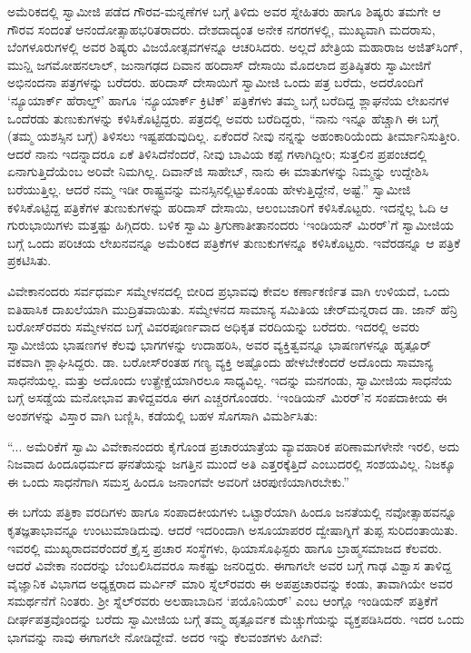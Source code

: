 ಅಮೆರಿಕದಲ್ಲಿ ಸ್ವಾಮೀಜಿ ಪಡೆದ ಗೌರವ-ಮನ್ನಣೆಗಳ ಬಗ್ಗೆ ತಿಳಿದು ಅವರ ಸ್ನೇಹಿತರು ಹಾಗೂ ಶಿಷ್ಯರು ತಮಗೇ ಆ ಗೌರವ ಸಂದಂತೆ ಆನಂದೋತ್ಸಾಹಭರಿತರಾದರು. ದೇಶದಾದ್ಯಂತ ಅನೇಕ ನಗರಗಳಲ್ಲಿ, ಮುಖ್ಯವಾಗಿ ಮದರಾಸು, ಬೆಂಗಳೂರುಗಳಲ್ಲಿ ಅವರ ಶಿಷ್ಯರು ವಿಜಯೋತ್ಸವಗಳನ್ನೂ ಆಚರಿಸಿದರು. ಅಲ್ಲದೆ ಖೇತ್ರಿಯ ಮಹಾರಾಜ ಅಜಿತ್​ಸಿಂಗ್, ಮುನ್ಷಿ ಜಗಮೋಹನಲಾಲ್, ಜುನಾಗಢದ ದಿವಾನ ಹರಿದಾಸ್ ದೇಸಾಯಿ ಮೊದಲಾದ ಪ್ರತಿಷ್ಠಿತರು ಸ್ವಾಮೀಜಿಗೆ ಅಭಿನಂದನಾ ಪತ್ರಗಳನ್ನು ಬರೆದರು. ಹರಿದಾಸ್ ದೇಸಾಯಿಗೆ ಸ್ವಾಮೀಜಿ ಒಂದು ಪತ್ರ ಬರೆದು, ಅದರೊಂದಿಗೆ ‘ನ್ಯೂಯಾರ್ಕ್ ಹೆರಾಲ್ಡ್​’ ಹಾಗೂ ‘ನ್ಯೂಯಾರ್ಕ್ ಕ್ರಿಟಿಕ್​’ ಪತ್ರಿಕೆಗಳು ತಮ್ಮ ಬಗ್ಗೆ ಬರೆದಿದ್ದ ಶ್ಲಾಘನೆಯ ಲೇಖನಗಳ ಒಂದೆರಡು ತುಣುಕುಗಳನ್ನು ಕಳಿಸಿಕೊಟ್ಟಿದ್ದರು. ಪತ್ರದಲ್ಲಿ ಅವರು ಬರೆದಿದ್ದರು, “ನಾನು ಇನ್ನೂ ಹೆಚ್ಚಾಗಿ ಈ ಬಗ್ಗೆ (ತಮ್ಮ ಯಶಸ್ಸಿನ ಬಗ್ಗೆ) ತಿಳಿಸಲು ಇಷ್ಟಪಡುವುದಿಲ್ಲ. ಏಕೆಂದರೆ ನೀವು ನನ್ನನ್ನು ಅಹಂಕಾರಿಯೆಂದು ತೀರ್ಮಾನಿಸುತ್ತೀರಿ. ಆದರೆ ನಾನು ಇದನ್ನಾದರೂ ಏಕೆ ತಿಳಿಸಿದೆನೆಂದರೆ, ನೀವು ಬಾವಿಯ ಕಪ್ಪೆ ಗಳಾಗಿದ್ದೀರಿ; ಸುತ್ತಲಿನ ಪ್ರಪಂಚದಲ್ಲಿ ಏನಾಗುತ್ತಿದೆಯೆಂಬ ಅರಿವೇ ನಿಮಗಿಲ್ಲ. ದಿವಾನ್​ಜಿ ಸಾಹೇಬ್, ನಾನು ಈ ಮಾತುಗಳನ್ನು ನಿಮ್ಮನ್ನು ಉದ್ದೇಶಿಸಿ ಬರೆಯುತ್ತಿಲ್ಲ. ಆದರೆ ನಮ್ಮ ಇಡೀ ರಾಷ್ಟ್ರವನ್ನು ಮನಸ್ಸಿನಲ್ಲಿಟ್ಟುಕೊಂಡು ಹೇಳುತ್ತಿದ್ದೇನೆ, ಅಷ್ಟೆ.” ಸ್ವಾಮೀಜಿ ಕಳಿಸಿಕೊಟ್ಟಿದ್ದ ಪತ್ರಿಕೆಗಳ ತುಣುಕುಗಳನ್ನು ಹರಿದಾಸ್ ದೇಸಾಯಿ, ಆಲಂಬಜಾರಿಗೆ ಕಳಿಸಿಕೊಟ್ಟರು. ಇದನ್ನೆಲ್ಲ ಓದಿ ಆ ಗುರುಭಾಯಿಗಳು ಮತ್ತಷ್ಟು ಹಿಗ್ಗಿದರು. ಬಳಿಕ ಸ್ವಾಮಿ ತ್ರಿಗುಣಾತೀತಾನಂದರು ‘ಇಂಡಿಯನ್ ಮಿರರ್​’ಗೆ ಸ್ವಾಮೀಜಿಯ ಬಗ್ಗೆ ಒಂದು ಪರಿಚಯ ಲೇಖನವನ್ನೂ ಅಮೆರಿಕದ ಪತ್ರಿಕೆಗಳ ತುಣುಕುಗಳನ್ನೂ ಕಳಿಸಿಕೊಟ್ಟರು. ಇವೆರಡನ್ನೂ ಆ ಪತ್ರಿಕೆ ಪ್ರಕಟಿಸಿತು.

ವಿವೇಕಾನಂದರು ಸರ್ವಧರ್ಮ ಸಮ್ಮೇಳನದಲ್ಲಿ ಬೀರಿದ ಪ್ರಭಾವವು ಕೇವಲ ಕರ್ಣಾಕರ್ಣಿತ ವಾಗಿ ಉಳಿಯದೆ, ಒಂದು ಐತಿಹಾಸಿಕ ದಾಖಲೆಯಾಗಿ ಮುದ್ರಿತವಾಯಿತು. ಸಮ್ಮೇಳನದ ಸಾಮಾನ್ಯ ಸಮಿತಿಯ ಚೇರ್​ಮನ್ನರಾದ ಡಾ. ಜಾನ್ ಹೆನ್ರಿ ಬರೋಸ್​ರವರು ಸಮ್ಮೇಳನದ ಬಗ್ಗೆ ವಿವರಪೂರ್ಣವಾದ ಅಧಿಕೃತ ವರದಿಯನ್ನು ಬರೆದರು. ಇದರಲ್ಲಿ ಅವರು ಸ್ವಾಮೀಜಿಯ ಭಾಷಣಗಳ ಕೆಲವು ಭಾಗಗಳನ್ನು ಉದಾಹರಿಸಿ, ಅವರ ವ್ಯಕ್ತಿತ್ವವನ್ನೂ ಭಾಷಣಗಳನ್ನೂ ಹೃತ್ಪೂರ್ ವಕವಾಗಿ ಶ್ಲಾಘಿಸಿದ್ದರು. ಡಾ. ಬರೋಸ್​ರಂತಹ ಗಣ್ಯ ವ್ಯಕ್ತಿ ಅಷ್ಟೊಂದು ಹೇಳಬೇಕೆಂದರೆ ಅದೊಂದು ಸಾಮಾನ್ಯ ಸಾಧನೆಯಲ್ಲ. ಮತ್ತು ಅದೊಂದು ಉತ್ಪ್ರೇಕ್ಷೆಯಾಗಿರಲೂ ಸಾಧ್ಯವಿಲ್ಲ. ಇದನ್ನು ಮನಗಂಡು, ಸ್ವಾಮೀಜಿಯ ಸಾಧನೆಯ ಬಗ್ಗೆ ಅಸಡ್ಡೆಯ ಮನೋಭಾವ ತಾಳಿದ್ದವರೂ ಈಗ ಎಚ್ಚರಗೊಂಡರು. ‘ಇಂಡಿಯನ್ ಮಿರರ್​’ನ ಸಂಪದಾಕೀಯ ಈ ಅಂಶಗಳನ್ನು ವಿಸ್ತಾರ ವಾಗಿ ಬಣ್ಣಿಸಿ, ಕಡೆಯಲ್ಲಿ ಬಹಳ ಸೊಗಸಾಗಿ ವಿಮರ್ಶಿಸಿತು:

“... ಅಮೆರಿಕೆಗೆ ಸ್ವಾಮಿ ವಿವೇಕಾನಂದರು ಕೈಗೊಂಡ ಪ್ರಚಾರಯಾತ್ರೆಯ ವ್ಯಾವಹಾರಿಕ ಪರಿಣಾಮಗಳೇನೇ ಇರಲಿ, ಅದು ನಿಜವಾದ ಹಿಂದೂಧರ್ಮದ ಘನತೆಯನ್ನು ಜಗತ್ತಿನ ಮುಂದೆ ಅತಿ ಎತ್ತರಕ್ಕೆತ್ತಿದೆ ಎಂಬುದರಲ್ಲಿ ಸಂಶಯವಿಲ್ಲ. ನಿಜಕ್ಕೂ ಈ ಒಂದು ಸಾಧನೆಗಾಗಿ ಸಮಸ್ತ ಹಿಂದೂ ಜನಾಂಗವೇ ಅವರಿಗೆ ಚಿರಪುಣಿಯಾಗಿರಬೇಕು.”

ಈ ಬಗೆಯ ಪತ್ರಿಕಾ ವರದಿಗಳು ಹಾಗೂ ಸಂಪಾದಕೀಯಗಳು ಒಟ್ಟಾರೆಯಾಗಿ ಹಿಂದೂ ಜನತೆಯಲ್ಲಿ ನವೋತ್ಸಾಹವನ್ನೂ ಕೃತಜ್ಞತಾಭಾವನ್ನೂ ಉಂಟುಮಾಡಿದುವು. ಆದರೆ ಇದರಿಂದಾಗಿ ಅಸೂಯಾಪರರ ದ್ವೇಷಾಗ್ನಿಗೆ ತುಪ್ಪ ಸುರಿದಂತಾಯಿತು. ಇವರಲ್ಲಿ ಮುಖ್ಯರಾದವರೆಂದರೆ ಕ್ರೈಸ್ತ ಪ್ರಚಾರ ಸಂಸ್ಥೆಗಳು, ಥಿಯಾಸೊಫಿಸ್ಟರು ಹಾಗೂ ಬ್ರಾಹ್ಮಸಮಾಜದ ಕೆಲವರು. ಆದರೆ ವಿವೇಕಾ ನಂದರನ್ನು ಬೆಂಬಲಿಸಿದವರೂ ಸಾಕಷ್ಟು ಜನರಿದ್ದರು. ಈಗಾಗಲೇ ಅವರ ಬಗ್ಗೆ ಗಾಢ ವಿಶ್ವಾಸ ತಾಳಿದ್ದ ವೈಜ್ಞಾನಿಕ ವಿಭಾಗದ ಅಧ್ಯಕ್ಷರಾದ ಮರ್ವಿನ್ ಮಾರಿ ಸ್ನೆಲ್​ರವರು ಈ ಅಪಪ್ರಚಾರವನ್ನು ಕಂಡು, ತಾವಾಗಿಯೇ ಅವರ ಸಮರ್ಥನೆಗೆ ನಿಂತರು. ಶ್ರೀ ಸ್ನೆಲ್​ರವರು ಅಲಹಾಬಾದಿನ ‘ಪಯೊನಿಯರ್​’ ಎಂಬ ಆಂಗ್ಲೊ ಇಂಡಿಯನ್ ಪತ್ರಿಕೆಗೆ ದೀರ್ಘಪತ್ರವೊಂದನ್ನು ಬರೆದು ಸ್ವಾಮೀಜಿಯ ಬಗ್ಗೆ ತಮ್ಮ ಹೃತ್ಪೂರ್ವಕ ಮೆಚ್ಚುಗೆಯನ್ನು ವ್ಯಕ್ತಪಡಿಸಿದರು. ಇದರ ಒಂದು ಭಾಗವನ್ನು ನಾವು ಈಗಾಗಲೇ ನೋಡಿದ್ದೇವೆ. ಅದರ ಇನ್ನು ಕೆಲವಂಶಗಳು ಹೀಗಿವೆ:

